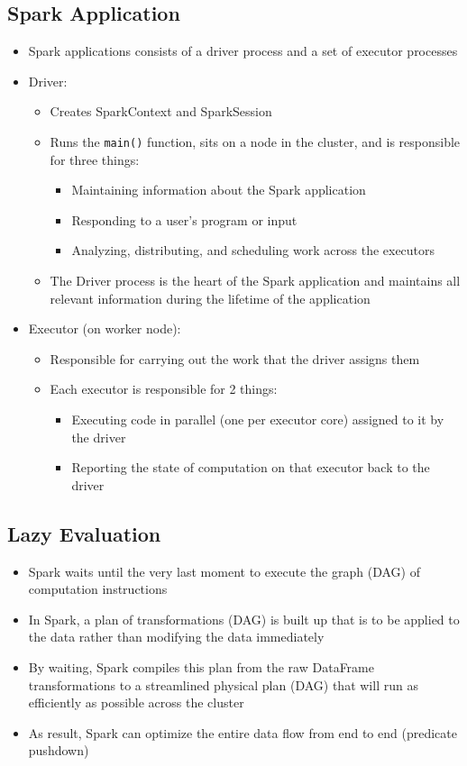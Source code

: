 \documentclass[11pt]{scrartcl}
\begin{document}
\subsection{Spark Application}
\begin{itemize}
	\item Spark applications consists of a driver process and a set of executor processes
	\item Driver:
	\begin{itemize}
		\item Creates SparkContext and SparkSession
		\item Runs the \texttt{main()} function, sits on a node in the cluster, and is responsible for three things:
		\begin{itemize}
			\item Maintaining information about the Spark application
			\item Responding to a user's program or input
			\item Analyzing, distributing, and scheduling work across the executors
		\end{itemize}
	\item The Driver process is the heart of the Spark application and maintains all relevant information during the lifetime of the application
	\end{itemize}
	\item Executor (on worker node):
	\begin{itemize}
		\item Responsible for carrying out the work that the driver assigns them
		\item Each executor is responsible for 2 things:
		\begin{itemize}
			\item Executing code in parallel (one per executor core) assigned to it by the driver
			\item Reporting the state of computation on that executor back to the driver
		\end{itemize}
	\end{itemize}
\end{itemize}

\subsection{Lazy Evaluation}
\begin{itemize}
	\item Spark waits until the very last moment to execute the graph (DAG) of computation instructions
	\item In Spark, a plan of transformations (DAG) is built up that is to be applied to the data rather than modifying the data immediately
	\item By waiting, Spark compiles this plan from the raw DataFrame transformations to a streamlined physical plan (DAG) that will run as efficiently as possible across the cluster
	\item As result, Spark can optimize the entire data flow from end to end (predicate pushdown)
\end{itemize}
\end{document}

